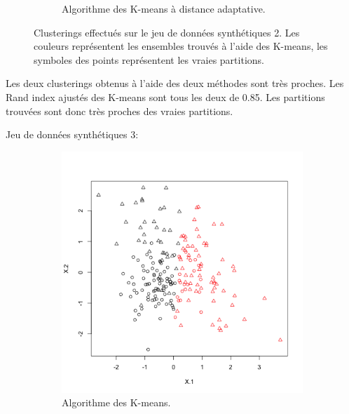 \documentclass[a4paper,11pt,oneside,roman]{article}
\begin{document}
\begin{figure}
\begin{subfigure}{.5\textwidth}
          \caption{Algorithme des K-means à distance adaptative.}
        \end{subfigure}
        \caption{Clusterings effectués sur le jeu de données synthétiques 2. Les couleurs représentent les ensembles trouvés à l'aide des K-means, les symboles des points représentent les vraies partitions.}
        \label{fig_synth_2}
    \end{figure}

    Les deux clusterings obtenus à l'aide des deux méthodes sont très proches.
    Les Rand index ajustés des K-means sont tous les deux de 0.85. Les partitions trouvées sont donc très proches des vraies partitions.
    
    Jeu de données synthétiques 3:
    \begin{figure}
        \centering
        \begin{subfigure}{.5\textwidth}
          \centering
          \includegraphics[width=.8\linewidth]{imgs/K_means_synth_3.png}
          \caption{Algorithme des K-means.}
        \end{subfigure}%
        \begin{subfigure}{.5\textwidth}
          \centering

\end{subfigure}
\end{figure}
\end{document}

